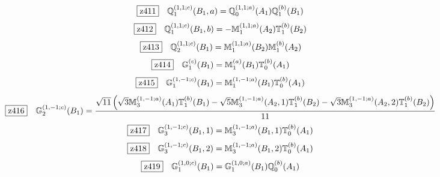 \documentclass[fleqn,10pt,landscape]{jsarticle}
\begin{document}
\begin{dmath*}
\hspace*{3mm}\fbox{z411}\quad \mathbb{Q}_{1}^{(1,1;c)}(B_{1},a)=\mathbb{Q}_{0}^{(1,1;a)}(A_{1}) \mathbb{Q}_{1}^{(b)}(B_{1})
\end{dmath*}
\begin{dmath*}
\hspace*{3mm}\fbox{z412}\quad \mathbb{Q}_{1}^{(1,1;c)}(B_{1},b)=- \mathbb{M}_{1}^{(1,1;a)}(A_{2}) \mathbb{T}_{1}^{(b)}(B_{2})
\end{dmath*}
\begin{dmath*}
\hspace*{3mm}\fbox{z413}\quad \mathbb{Q}_{2}^{(1,1;c)}(B_{1})=\mathbb{M}_{1}^{(1,1;a)}(B_{2}) \mathbb{M}_{1}^{(b)}(A_{2})
\end{dmath*}
\begin{dmath*}
\hspace*{3mm}\fbox{z414}\quad \mathbb{G}_{1}^{(c)}(B_{1})=\mathbb{M}_{1}^{(a)}(B_{1}) \mathbb{T}_{0}^{(b)}(A_{1})
\end{dmath*}
\begin{dmath*}
\hspace*{3mm}\fbox{z415}\quad \mathbb{G}_{1}^{(1,-1;c)}(B_{1})=\mathbb{M}_{1}^{(1,-1;a)}(B_{1}) \mathbb{T}_{0}^{(b)}(A_{1})
\end{dmath*}
\begin{dmath*}
\hspace*{3mm}\fbox{z416}\quad \mathbb{G}_{2}^{(1,-1;c)}(B_{1})=\frac{\sqrt{11} \left(\sqrt{3} \mathbb{M}_{3}^{(1,-1;a)}(A_{1}) \mathbb{T}_{1}^{(b)}(B_{1}) - \sqrt{5} \mathbb{M}_{3}^{(1,-1;a)}(A_{2},1) \mathbb{T}_{1}^{(b)}(B_{2}) - \sqrt{3} \mathbb{M}_{3}^{(1,-1;a)}(A_{2},2) \mathbb{T}_{1}^{(b)}(B_{2})\right)}{11}
\end{dmath*}
\begin{dmath*}
\hspace*{3mm}\fbox{z417}\quad \mathbb{G}_{3}^{(1,-1;c)}(B_{1},1)=\mathbb{M}_{3}^{(1,-1;a)}(B_{1},1) \mathbb{T}_{0}^{(b)}(A_{1})
\end{dmath*}
\begin{dmath*}
\hspace*{3mm}\fbox{z418}\quad \mathbb{G}_{3}^{(1,-1;c)}(B_{1},2)=\mathbb{M}_{3}^{(1,-1;a)}(B_{1},2) \mathbb{T}_{0}^{(b)}(A_{1})
\end{dmath*}
\begin{dmath*}
\hspace*{3mm}\fbox{z419}\quad \mathbb{G}_{1}^{(1,0;c)}(B_{1})=\mathbb{G}_{1}^{(1,0;a)}(B_{1}) \mathbb{Q}_{0}^{(b)}(A_{1})
\end{dmath*}
\end{document}

